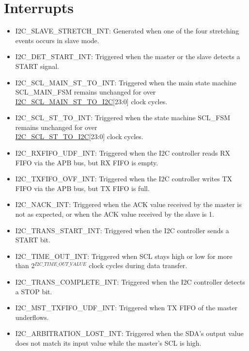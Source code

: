 \documentclass[main\_\_EN.tex]{subfiles}
\begin{document}
\section{Interrupts}\label{sub:i2c-int}
\begin{itemize}
\item \label{int:i2c-slave-stretch}I2C\_SLAVE\_STRETCH\_INT: Generated when one of the four stretching events occurs in slave mode.
\item \label{int:i2c-start}I2C\_DET\_START\_INT: Triggered when the master or the slave detects a START signal.
\item \label{int:i2c-scl-main-fsm}I2C\_SCL\_MAIN\_ST\_TO\_INT: Triggered when the main state machine SCL\_MAIN\_FSM remains unchanged for over \hyperref[fielddesc:I2CSCLMAINSTTOI2C]{I2C\_SCL\_MAIN\_ST\_TO\_I2C}[23:0] clock cycles.
\item \label{int:i2c-scl-fsm}I2C\_SCL\_ST\_TO\_INT: Triggered when the state machine SCL\_FSM remains unchanged for over \\\hyperref[fielddesc:I2CSCLSTTOI2C]{I2C\_SCL\_ST\_TO\_I2C}[23:0] clock cycles.
\item \label{int:i2c-rxfifo-udf}I2C\_RXFIFO\_UDF\_INT: Triggered when the I2C controller reads RX FIFO via the APB bus, but RX FIFO is empty.
\item \label{int:i2c-txfifo-ovf}I2C\_TXFIFO\_OVF\_INT: Triggered when the I2C controller writes TX FIFO via the APB bus, but TX FIFO is full.
\item \label{int:i2c-nack}I2C\_NACK\_INT: Triggered when the ACK value received by the master is not as expected, or when the ACK value received by the slave is 1.
\item \label{int:i2c-trans-start}I2C\_TRANS\_START\_INT: Triggered when the I2C controller sends a START bit.
\item \label{int:i2c-time-out}I2C\_TIME\_OUT\_INT: Triggered when SCL stays high or low for more than 2$^{\hyperref[fielddesc:I2CTIMEOUTVALUE]{I2C\_TIME\_OUT\_VALUE}}$ clock cycles during data transfer.
\item \label{int:i2c-trans-complete}I2C\_TRANS\_COMPLETE\_INT: Triggered when the I2C controller detects a STOP bit.
\item \label{int:i2c-mst-txfifo-udf}I2C\_MST\_TXFIFO\_UDF\_INT: Triggered when TX FIFO of the master underflows.
\item \label{int:i2c-arbitration-lost}I2C\_ARBITRATION\_LOST\_INT: Triggered when the SDA’s output value does not match its input value while the master’s SCL is high.

\end{itemize}
\end{document}
